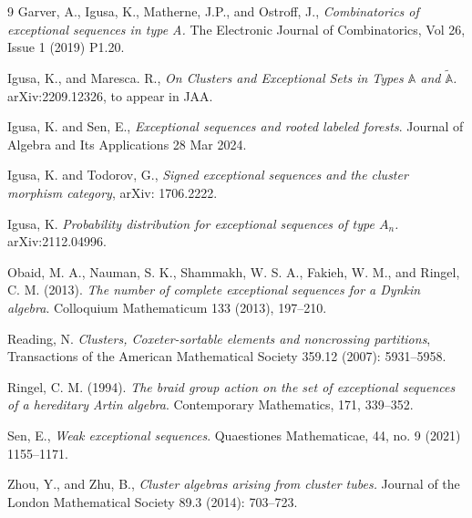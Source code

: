 \documentclass[11pt]{amsart}
\theoremstyle{definition}
\theoremstyle{remark}
\numberwithin{equation}{section}
\begin{document}
\begin{thebibliography}{9}
  Garver, A., Igusa, K., Matherne, J.P., and Ostroff, J., \textit{Combinatorics of exceptional sequences in type A.} The Electronic Journal of Combinatorics, Vol 26, Issue 1 (2019) P1.20.%



 Igusa, K., and Maresca. R., \emph{On Clusters and Exceptional Sets in Types $\mathbb {A} $ and $\tilde {\mathbb {A}} $.} arXiv:2209.12326, to appear in JAA. %



 Igusa, K. and Sen, E., \textit{Exceptional sequences and rooted labeled forests}. Journal of Algebra and Its Applications 28 Mar 2024. %


 Igusa, K. and Todorov, G., \textit{Signed exceptional sequences and the cluster morphism category}, arXiv: 1706.2222.%


 Igusa, K. \emph{Probability distribution for exceptional sequences of type $A_n$.} arXiv:2112.04996. %


 Obaid, M. A., Nauman, S. K., Shammakh, W. S. A., Fakieh, W. M., and Ringel, C. M. (2013). \textit{The number of complete exceptional sequences for a Dynkin algebra}. Colloquium Mathematicum 133 (2013), 197--210.%

 Reading, N.  \textit{Clusters, Coxeter-sortable elements and noncrossing partitions}, Transactions of the American Mathematical Society 359.12 (2007): 5931--5958. %

 Ringel, C. M. (1994). \textit{The braid group action on the set of exceptional sequences of a hereditary Artin algebra}. Contemporary Mathematics, 171, 339--352.%



 Sen, E., \textit{Weak exceptional sequences}. {Quaestiones Mathematicae}, 44, no. 9 (2021) 1155--1171. %

 Zhou, Y., and Zhu, B., \textit{Cluster algebras arising from cluster tubes.} Journal of the London Mathematical Society 89.3 (2014): 703--723. %

\end{thebibliography} 
\end{document}
